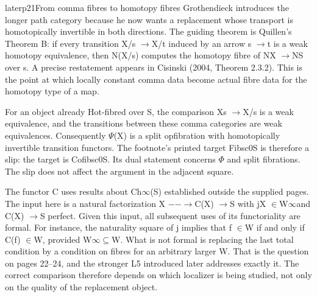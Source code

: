\begin{dcomment}{later}{p21}{From comma fibres to homotopy fibres}
Grothendieck introduces the longer path category because he now wants a replacement whose transport is homotopically invertible in both directions. The guiding theorem is Quillen’s Theorem B: if every transition X/s \ensuremath{\to}X/t induced by an arrow s \ensuremath{\to}t is a weak homotopy equivalence, then N(X/s) computes the homotopy fibre of NX \ensuremath{\to}NS over s. A precise restatement appears in Cisinski (2004, Theorem 2.3.2). This is the point at which locally constant comma data become actual fibre data for the homotopy type of a map.

For an object already Hot-fibred over S, the comparison Xs \ensuremath{\to}X/s is a weak equivalence, and the transitions between these comma categories are weak equivalences. Consequently \ensuremath{\Psi}(X) is a split opfibration with homotopically invertible transition functors. The footnote’s printed target Fibsc0S is therefore a slip: the target is Cofibsc0S. Its dual statement concerns \ensuremath{\Phi} and split fibrations. The slip does not affect the argument in the adjacent square.

The functor C uses results about Ch\ensuremath{\infty}(S) established outside the supplied pages. The input here is a natural factorization X \ensuremath{-}\ensuremath{-}\ensuremath{\to}C(X) \ensuremath{\to}S with jX \ensuremath{\in}W\ensuremath{\infty}and C(X) \ensuremath{\to}S perfect. Given this input, all subsequent uses of its functoriality are formal. For instance, the naturality square of j implies that f \ensuremath{\in}W if and only if C(f) \ensuremath{\in}W, provided W\ensuremath{\infty}\ensuremath{\subseteq}W. What is not formal is replacing the last total condition by a condition on fibres for an arbitrary larger W. That is the question on pages 22--24, and the stronger L5 introduced later addresses exactly it. The correct comparison therefore depends on which localizer is being studied, not only on the quality of the replacement object.

\end{dcomment}

